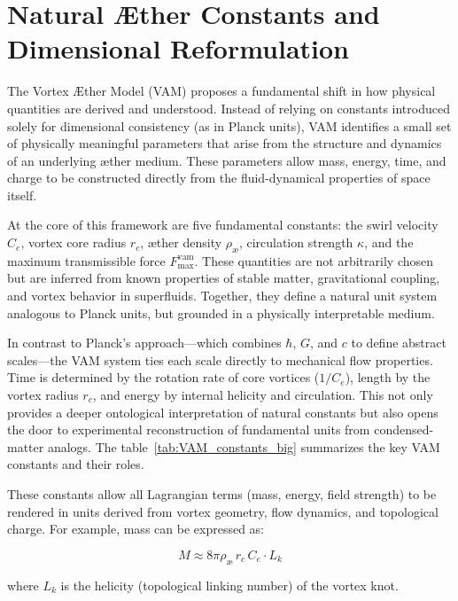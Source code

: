 
\section{ Natural Æther Constants and Dimensional Reformulation}
The Vortex Æther Model (VAM) proposes a fundamental shift in how physical quantities are derived and understood. Instead of relying on constants introduced solely for dimensional consistency (as in Planck units), VAM identifies a small set of physically meaningful parameters that arise from the structure and dynamics of an underlying æther medium. These parameters allow mass, energy, time, and charge to be constructed directly from the fluid-dynamical properties of space itself.

At the core of this framework are five fundamental constants: the swirl velocity $C_e$, vortex core radius $r_c$, æther density $\rho_\text{\ae}$, circulation strength $\kappa$, and the maximum transmissible force $F^{\text{vam}}_\text{max}$. These quantities are not arbitrarily chosen but are inferred from known properties of stable matter, gravitational coupling, and vortex behavior in superfluids. Together, they define a natural unit system analogous to Planck units, but grounded in a physically interpretable medium.

In contrast to Planck's approach—which combines $\hbar$, $G$, and $c$ to define abstract scales—the VAM system ties each scale directly to mechanical flow properties. Time is determined by the rotation rate of core vortices ($1/C_e$), length by the vortex radius $r_c$, and energy by internal helicity and circulation. This not only provides a deeper ontological interpretation of natural constants but also opens the door to experimental reconstruction of fundamental units from condensed-matter analogs. The table~\ref{tab:VAM_constants_big} summarizes the key VAM constants and their roles.

These constants allow all Lagrangian terms (mass, energy, field strength) to be rendered in units derived from vortex geometry, flow dynamics, and topological charge. For example, mass can be expressed as:

\begin{equation*}
    M \approx 8\pi \rho_\text{\ae} \, r_c \, C_e \cdot L_k
\end{equation*}

where $L_k$ is the helicity (topological linking number) of the vortex knot.


